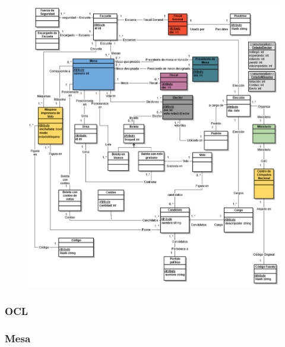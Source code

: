 \begin{figure}[h!]
  \begin{center}
	\includegraphics[scale=0.60]{imagenes/clases.png}
  \end{center}
\end{figure}

\newpage

\subsubsection{OCL}

\subsubsection*{Mesa}

